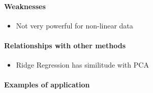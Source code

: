 \paragraph{Weaknesses}
\begin{itemize}
    \item Not very powerful for non-linear data

\end{itemize}

\paragraph{Relationships with other methods}
\begin{itemize}
    \item Ridge Regression has similitude with PCA
\end{itemize}

\paragraph{Examples of application}


